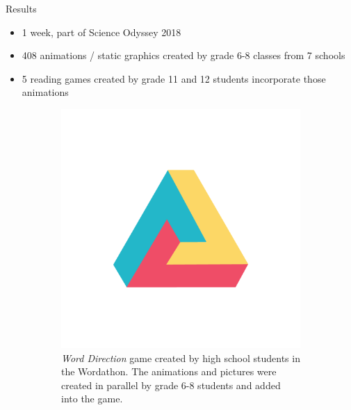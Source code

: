 \documentclass[22pt]{beamer}
\begin{document}
\begin{frame}[fragile]
\begin{textblock}{7.25}
\begin{block}{Results}
\begin{itemize}
\item 1 week, part of Science Odyssey 2018
\item 408 animations / static graphics created by grade 6-8 classes from 7 schools
\item 5 reading games created by grade 11 and 12 students incorporate those animations
\end{itemize}

\begin{figure}[htbp] %
\begin{subfigure}{0.49\textwidth}
   \centering
   \includegraphics[width=19cm]{dh.png} 
   \caption*{\textit{Word Direction} game created by high school students in the Wordathon. The animations and pictures were created in parallel by grade 6-8 students and added into the game.}
   \label{fig:TwoAngles}
\end{subfigure}
\begin{subfigure}{0.45\textwidth}
   \centering

\end{subfigure}
\end{figure}
\end{block}
\end{textblock}
\end{frame}
\end{document}
